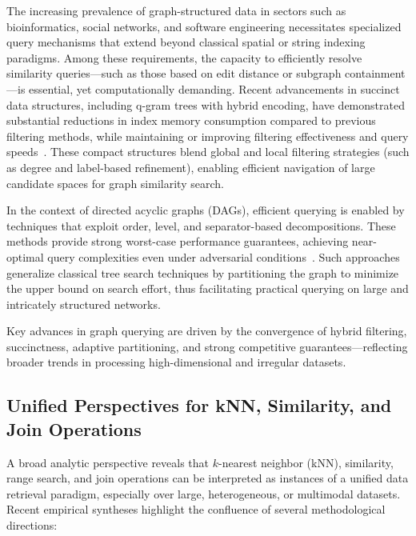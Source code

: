 The increasing prevalence of graph-structured data in sectors such as bioinformatics, social networks, and software engineering necessitates specialized query mechanisms that extend beyond classical spatial or string indexing paradigms. Among these requirements, the capacity to efficiently resolve similarity queries—such as those based on edit distance or subgraph containment—is essential, yet computationally demanding. Recent advancements in succinct data structures, including q-gram trees with hybrid encoding, have demonstrated substantial reductions in index memory consumption compared to previous filtering methods, while maintaining or improving filtering effectiveness and query speeds~\cite{ref106}. These compact structures blend global and local filtering strategies (such as degree and label-based refinement), enabling efficient navigation of large candidate spaces for graph similarity search.

In the context of directed acyclic graphs (DAGs), efficient querying is enabled by techniques that exploit order, level, and separator-based decompositions. These methods provide strong worst-case performance guarantees, achieving near-optimal query complexities even under adversarial conditions~\cite{ref107}. Such approaches generalize classical tree search techniques by partitioning the graph to minimize the upper bound on search effort, thus facilitating practical querying on large and intricately structured networks.

Key advances in graph querying are driven by the convergence of hybrid filtering, succinctness, adaptive partitioning, and strong competitive guarantees—reflecting broader trends in processing high-dimensional and irregular datasets.

\subsection{Unified Perspectives for kNN, Similarity, and Join Operations}

A broad analytic perspective reveals that $k$-nearest neighbor (kNN), similarity, range search, and join operations can be interpreted as instances of a unified data retrieval paradigm, especially over large, heterogeneous, or multimodal datasets. Recent empirical syntheses highlight the confluence of several methodological directions:


